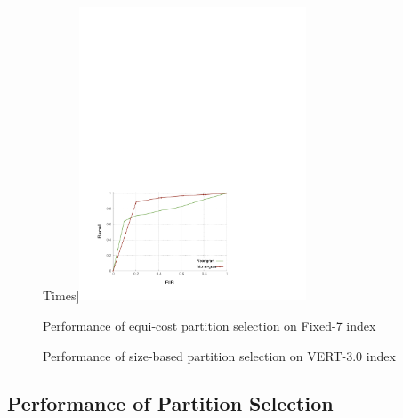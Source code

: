 \begin{figure}
  Times]{\label{fig:vary_time_nyt_psp_fixed_7d}\includegraphics[width=0.60\textwidth]{plots/selection/cc_results/round2/pdf/nyt-time-interval-granularity-psp-7days.pdf}}
  	
  \caption{Performance of equi-cost partition selection on Fixed-7 index}
  \label{fig:psp_query_times}
\end{figure}

\begin{figure}
  \centering
  
  \caption{Performance of size-based partition selection on VERT-3.0 index}
  \label{fig:pse_query_times_sb}
\end{figure}

\subsection{Performance of Partition Selection}
\label{sec:exp_ps}



